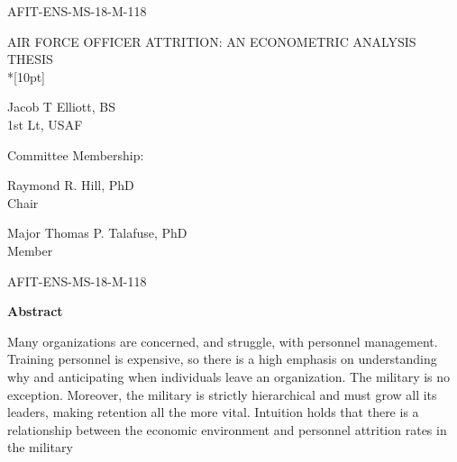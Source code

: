 \documentclass[12pt,letterpaper,toc=flat,oneside]{report}
\theoremstyle{definition}
\theoremstyle{definition}
\theoremstyle{definition}
\theoremstyle{remark}
\begin{document}
	\thispagestyle{empty}
	\setcounter{page}{3}
	\noindent AFIT-ENS-MS-18-M-118
	\vfill
	\begin{center}
	    \MakeUppercase{Air Force Officer Attrition: An Econometric Analysis}\\[10pt]
	    \MakeUppercase{Thesis}\\*[10pt]
	    
	    \begingroup
  \singlespace
    Jacob T Elliott, BS\\ 
    1st Lt, \MakeUppercase{USAF}
    \par
  \endgroup
  
	\bigskip\medskip
	Committee Membership:
	\bigskip\medskip
	
	\begingroup
  \singlespace
    Raymond R. Hill, PhD\\ 
    Chair
    \par
  \endgroup
  \bigskip\bigskip
  
  \begingroup
  \singlespace
    Major Thomas P. Talafuse, PhD\\ 
    Member
    \par
  \endgroup
  \bigskip\bigskip
  
    
    
    
  	\end{center}
	\vfill
	\newpage
	\setcounter{page}{4}
	\renewcommand{\thepage}{\roman{page}}
    \thispagestyle{plain}
    \noindent AFIT-ENS-MS-18-M-118
    \begin{center}
	\Large\bfseries Abstract
    \end{center}
    \vspace{2em}
    Many organizations are concerned, and struggle, with personnel
management. Training personnel is expensive, so there is a high emphasis
on understanding why and anticipating when individuals leave an
organization. The military is no exception. Moreover, the military is
strictly hierarchical and must grow all its leaders, making retention
all the more vital. Intuition holds that there is a relationship between
the economic environment and personnel attrition rates in the military
\end{document}
